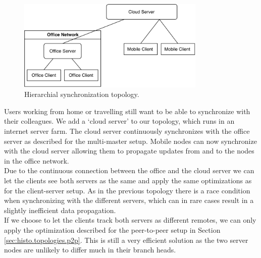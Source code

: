 \begin{figure}[H]
  \centering
  \includegraphics[width=0.8\textwidth]{img/hierarchical}
  \caption{Hierarchial synchronization topology.}
  \label{fig:histo.topologies.hierarchical}
\end{figure}

Users working from home or travelling still want to be able to synchronize with their colleagues.
We add a `cloud server' to our topology, which runs in an internet server farm.
The cloud server continuously synchronizes with the office server as described for the multi-master setup.
Mobile nodes can now synchronize with the cloud server allowing them to propagate updates from and to the nodes in the office network.\\
Due to the continuous connection between the office and the cloud server we can let the clients see both servers as the same and apply the same optimizations as for the client-server setup.
As in the previous topology there is a race condition when synchronizing with the different servers, which can in rare cases result in a slightly inefficient data propagation.\\
If we choose to let the clients track both servers as different remotes, we can only apply the optimization described for the peer-to-peer setup in Section \ref{sec:histo.topologies.p2p}.
This is still a very efficient solution as the two server nodes are unlikely to differ much in their branch heads.
